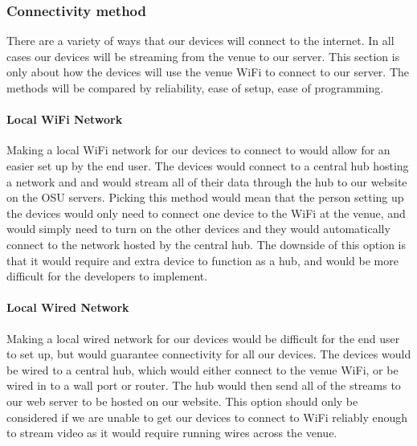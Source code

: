 \documentclass[onecolumn, draftclsnofoot,10pt, compsoc]{IEEEtran}
\begin{document}
        \subsubsection{Connectivity method}
        There are a variety of ways that our devices will connect to the internet. In all cases our devices will be streaming from the venue to our server. This section is only about how the devices will use the venue WiFi to connect to our server. The methods will be compared by reliability, ease of setup, ease of programming.
            \paragraph{Local WiFi Network}
            Making a local WiFi network for our devices to connect to would allow for an easier set up by the end user. The devices would connect to a central hub hosting a network and and would stream all of their data through the hub to our website on the OSU servers. Picking this method would mean that the person setting up the devices would only need to connect one device to the WiFi at the venue, and would simply need to turn on the other devices and they would automatically connect to the network hosted by the central hub. The downside of this option is that it would require and extra device to function as a hub, and would be more difficult for the developers to implement.
        
            \paragraph{Local Wired Network}
            Making a local wired network for our devices would be difficult for the end user to set up, but would guarantee connectivity for all our devices. The devices would be wired to a central hub, which would either connect to the venue WiFi, or be wired in to a wall port or router. The hub would then send all of the streams to our web server to be hosted on our website. This option should only be considered if we are unable to get our devices to connect to WiFi reliably enough to stream video as it would require running wires across the venue.
        
\end{document}
